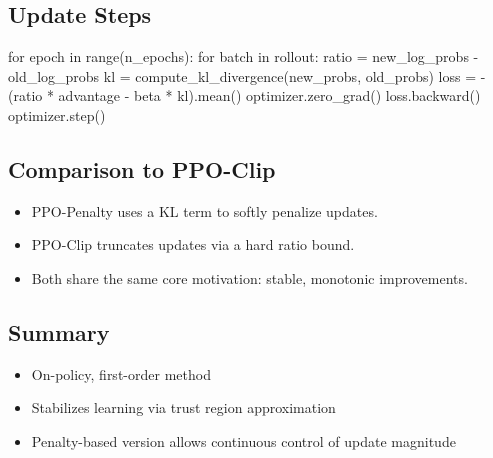 \documentclass{article}
\begin{document}
\subsection{Update Steps}

\begin{python}
for epoch in range(n_epochs):
    for batch in rollout:
        ratio = new_log_probs - old_log_probs
        kl = compute_kl_divergence(new_probs, old_probs)
        loss = -(ratio * advantage - beta * kl).mean()
        optimizer.zero_grad()
        loss.backward()
        optimizer.step()
\end{python}

\subsection{Comparison to PPO-Clip}

\begin{itemize}
    \item PPO-Penalty uses a KL term to softly penalize updates.
    \item PPO-Clip truncates updates via a hard ratio bound.
    \item Both share the same core motivation: stable, monotonic improvements.
\end{itemize}

\subsection{Summary}

\begin{itemize}
    \item On-policy, first-order method
    \item Stabilizes learning via trust region approximation
    \item Penalty-based version allows continuous control of update magnitude
\end{itemize}
\end{document}
